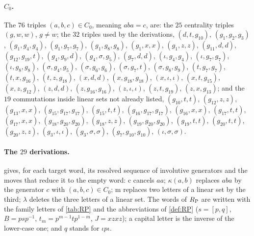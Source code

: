 \paragraph{$C_0$.} The $76$ triples $(a,b,c)\in C_0$, meaning $aba=c$, are: the $25$ centrality triples $(g,w,w)$, $g\ne w$; the $32$
triples used by the derivations, $(d,t,g_{10})$, $(g_{1},g_{2},g_{3})$, $(g_{1},g_{4},g_{4})$, $(g_{1},g_{7},g_{7})$, $(g_{1},g_{8},g_{8})$,
$(g_{1},x,x)$, $(g_{1},z,z)$, $(g_{11},d,d)$, $(g_{12},g_{19},t)$, $(g_{4},g_{9},d)$, $(g_{4},\sigma,g_{5})$, $(g_{7},d,d)$,
$(\iota,g_{4},g_{4})$, $(\iota,g_{7},g_{7})$, $(\iota,g_{8},g_{8})$, $(\sigma,g_{4},g_{5})$, $(\sigma,g_{6},g_{6})$, $(\sigma,g_{7},t)$,
$(\sigma,g_{8},g_{9})$, $(t,g_{7},g_{7})$, $(t,x,g_{16})$, $(t,z,g_{18})$, $(x,d,d)$, $(x,g_{18},g_{18})$, $(x,\iota,\iota)$,
$(x,t,g_{15})$, $(x,z,g_{12})$, $(z,d,d)$, $(z,g_{16},g_{16})$, $(z,\iota,\iota)$, $(z,t,g_{19})$, $(z,x,g_{13})$; and the $19$ commutations
inside linear sets not already listed, $(g_{10},t,t)$, $(g_{12},z,z)$, $(g_{13},x,x)$, $(g_{15},g_{17},g_{17})$, $(g_{15},t,t)$,
$(g_{16},g_{17},g_{17})$, $(g_{16},x,x)$, $(g_{17},t,t)$, $(g_{17},x,x)$, $(g_{18},g_{20},g_{20})$, $(g_{18},z,z)$,
$(g_{19},g_{20},g_{20})$, $(g_{19},t,t)$, $(g_{20},t,t)$, $(g_{20},z,z)$, $(g_{3},\iota,\iota)$, $(g_{3},\sigma,\sigma)$,
$(g_{7},g_{10},g_{10})$, $(\iota,\sigma,\sigma)$.

\paragraph{The $29$ derivations.}  gives, for each target word, its resolved sequence of involutive generators and the
moves that reduce it to the empty word: c cancels $aa$; $\kappa(a,b)$ replaces $aba$ by the generator $c$ with $(a,b,c)\in C_0$; m replaces
two letters of a linear set by the third; $\lambda$ deletes the three letters of a linear set. The words of $R_{\mathrm P}$ are written with the
family letters of \cref{tab:RP} and the abbreviations of \cref{def:RP} ($s=[p,q]$, $B=psp^{-1}$, $t_m=p^{m-1}tp^{1-m}$, $J=xzxz$); a capital
letter is the inverse of the lower-case one; and $q$ stands for $\iota p\iota$.

